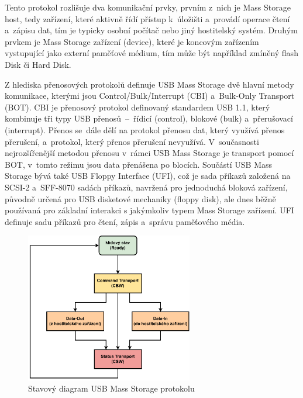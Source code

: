Tento protokol rozlišuje dva komunikační prvky, prvním z~nich je Mass Storage host, tedy zařízení, které aktivně řídí přístup k~úložišti a~provádí operace čtení a~zápisu dat, tím je typicky osobní počítač nebo jiný hostitelský systém. Druhým prvkem je Mass Storage zařízení (device), které je koncovým zařízením vystupující jako externí paměťové médium, tím může být například zmíněný flash Disk či Hard Disk.~\cite{usb_standard_ufi, silicon_labs_mass_storage_protocol}

Z hlediska přenosových protokolů definuje USB Mass Storage dvě hlavní metody komunikace, kterými jsou Control/Bulk/Interrupt (CBI) a~Bulk-Only Transport (BOT). CBI je přenosový protokol definovaný standardem USB 1.1, který kombinuje tři typy USB přenosů~--~řídicí (control), blokové (bulk) a~přerušovací (interrupt). Přenos se~dále dělí na protokol přenosu dat, který využívá přenos přerušení, a~protokol, který přenos přerušení nevyužívá. V~současnosti nejrozšířenější metodou přenosu v~rámci USB Mass Storage je transport pomocí BOT, v~tomto režimu jsou data přenášena po blocích.
Součástí USB Mass Storage bývá také USB Floppy Interface (UFI), což je sada příkazů založená na SCSI-2 a~SFF-8070 sadách příkazů, navržená pro jednoduchá bloková zařízení, původně určená pro USB disketové mechaniky (floppy disk), ale dnes běžně používaná pro základní interakci s jakýmkoliv typem Mass Storage zařízení. UFI definuje sadu příkazů pro čtení, zápis a~správu paměťového média.~\cite{usb_standard_ufi}

\begin{figure}[h]
    \centering
    \includegraphics[width=0.65\textwidth]{obrazky-figures/mass_storage_protocol-cz.pdf}
    
    \caption{Stavový diagram USB Mass Storage protokolu~\cite{silicon_labs_mass_storage_protocol}}
    \label{fig:mass-storage-protocol}
\end{figure}

